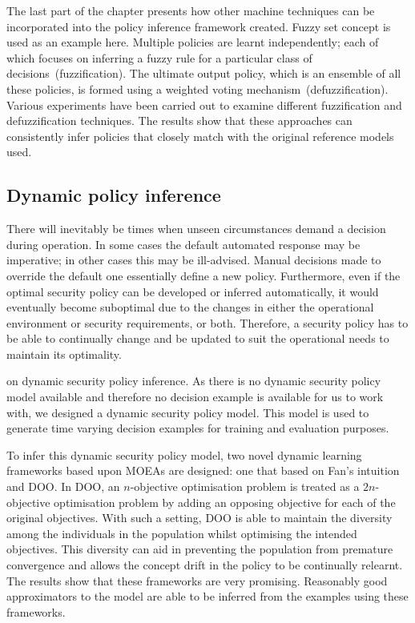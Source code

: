 The last part of the chapter presents how other machine techniques can
be incorporated into the policy inference framework created. Fuzzy set
concept is used as an example here. Multiple policies are learnt
independently; each of which focuses on inferring a fuzzy rule for a
particular class of decisions~(fuzzification). The ultimate output
policy, which is an ensemble of all these policies, is formed using a
weighted voting mechanism~(defuzzification). Various experiments have
been carried out to examine different fuzzification and
defuzzification techniques. The results show that these approaches can
consistently infer policies that closely match with the original
reference models used.

\subsection{Dynamic policy inference}
\label{Evaluation.DynamicSecurityPolicyInference}
There will inevitably be times when unseen circumstances demand a
decision during operation. In some cases the default automated
response may be imperative; in other cases this may be
ill-advised. Manual decisions made to override the default one
essentially define a new policy. Furthermore, even if the optimal
security policy can be developed or inferred automatically, it would
eventually become suboptimal due to the changes in either the
operational environment or security requirements, or both. Therefore, a
security policy has to be able to continually change and be updated to
suit the operational needs to maintain its optimality.


on dynamic security policy inference. As there is no dynamic security
policy model available and therefore no decision example is available
for us to work with, we designed a dynamic security policy model. This
model is used to generate time varying decision examples for training
and evaluation purposes.

To infer this dynamic security policy model, two novel dynamic
learning frameworks based upon MOEAs are designed: one that based on
Fan's intuition~\cite{FW04} and DOO. In DOO, an $n$-objective
optimisation problem is treated as a $2n$-objective optimisation
problem by adding an opposing objective for each of the original
objectives. With such a setting, DOO is able to maintain the diversity
among the individuals in the population whilst optimising the intended
objectives. This diversity can aid in preventing the population from
premature convergence and allows the concept drift in the policy to be
continually relearnt. The results show that these frameworks are very
promising. Reasonably good approximators to the model are able to be
inferred from the examples using these frameworks.

